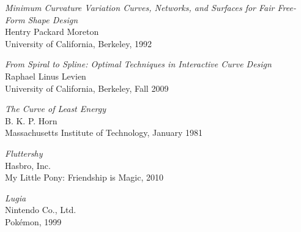 \documentclass[a4paper]{article}
\begin{document}
	\begin{thebibliography}{}

			\emph{Minimum Curvature Variation Curves, Networks, and Surfaces for Fair Free-Form Shape Design}\\
			Hentry Packard Moreton\\
			University of California, Berkeley, 1992

			\emph{From Spiral to Spline: Optimal Techniques in Interactive Curve Design}\\
			Raphael Linus Levien\\
			University of California, Berkeley, Fall 2009

			\emph{The Curve of Least Energy}\\
			B. K. P. Horn\\
			Massachusetts Institute of Technology, January 1981

			\emph{Fluttershy}\\
			Hasbro, Inc.\\
			My Little Pony: Friendship is Magic, 2010

			\emph{Lugia}\\
			Nintendo Co., Ltd.\\
			Pokémon, 1999

	\end{thebibliography}
\end{document}
